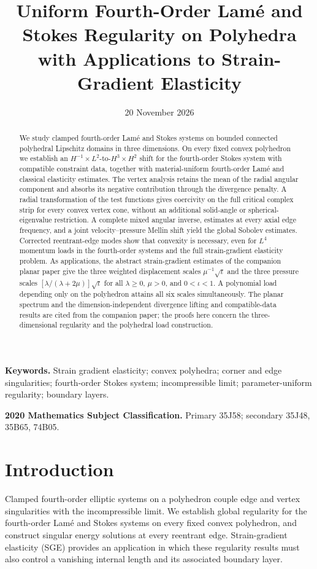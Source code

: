 \documentclass[11pt,a4paper]{article}
\title{\bfseries Uniform Fourth-Order Lam\'e and Stokes Regularity on Polyhedra with Applications to Strain-Gradient Elasticity}
\author{}
\date{20 November 2026}
\theoremstyle{remark}
\numberwithin{equation}{section}
\begin{document}
\maketitle
\begin{abstract}
We study clamped fourth-order Lam\'e and Stokes systems on bounded
connected polyhedral Lipschitz domains in three dimensions. On every
fixed convex polyhedron we establish an
\(H^{-1}\times L^2\)-to-\(H^3\times H^2\) shift for the fourth-order
Stokes system with compatible constraint data, together with
material-uniform fourth-order Lam\'e and classical elasticity estimates.
The vertex analysis retains the mean of the radial angular component
and absorbs its negative contribution through the divergence penalty.
A radial transformation of the test functions gives coercivity on the
full critical complex strip for every convex vertex cone, without an
additional solid-angle or spherical-eigenvalue restriction. A complete
mixed angular inverse, estimates at every axial edge frequency, and a
joint velocity--pressure Mellin shift yield the global Sobolev estimates.
Corrected reentrant-edge modes show that convexity is necessary, even
for \(L^4\) momentum loads in the fourth-order systems and the full
strain-gradient elasticity problem. As applications, the abstract
strain-gradient estimates of the companion planar paper give the three
weighted displacement scales \(\mu^{-1}\sqrt\iota\) and the three pressure
scales \([\lambda/(\lambda+2\mu)]\sqrt\iota\) for all
\(\lambda\ge0\), \(\mu>0\), and \(0<\iota<1\).
A polynomial load depending only on the polyhedron attains all six
scales simultaneously. The planar spectrum and the dimension-independent
divergence lifting and compatible-data results are cited from the
companion paper; the proofs here concern the three-dimensional
regularity and the polyhedral load construction.
\end{abstract}
\noindent\textbf{Keywords.} Strain gradient elasticity; convex polyhedra;
corner and edge singularities; fourth-order Stokes system; incompressible
limit; parameter-uniform regularity; boundary layers.

\smallskip
\noindent\textbf{2020 Mathematics Subject Classification.} Primary 35J58;
secondary 35J48, 35B65, 74B05.

\section{Introduction}

Clamped fourth-order elliptic systems on a polyhedron couple edge and
vertex singularities with the incompressible limit. We establish global
regularity for the fourth-order Lam\'e and Stokes systems on every fixed
convex polyhedron, and construct singular energy solutions at every
reentrant edge. Strain-gradient elasticity (SGE) provides an application
in which these regularity results must also control a vanishing internal
length and its associated boundary layer.
\end{document}
